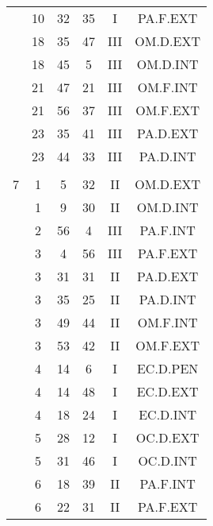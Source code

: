 \documentclass[12pt, a4paper]{article}
\begin{document}
\begin{multicols}{3}
{\begin{tabular}{c c c c c c}
	 	 	 	 & 10 & 32 & 35 & I & PA.F.EXT\\%
	 	 	 	 & 18 & 35 & 47 & III & OM.D.EXT\\%
	 	 	 	 & 18 & 45 & 5 & III & OM.D.INT\\%
	 	 	 	 & 21 & 47 & 21 & III & OM.F.INT\\%
	 	 	 	 & 21 & 56 & 37 & III & OM.F.EXT\\%
	 	 	 	 & 23 & 35 & 41 & III & PA.D.EXT\\%
	 	 	 	 & 23 & 44 & 33 & III & PA.D.INT\\%
	 	 	 	 & & & & & \\%
	 	 	 	7 & 1 & 5 & 32 & II & OM.D.EXT\\%
	 	 	 	 & 1 & 9 & 30 & II & OM.D.INT\\%
	 	 	 	 & 2 & 56 & 4 & III & PA.F.INT\\%
	 	 	 	 & 3 & 4 & 56 & III & PA.F.EXT\\%
	 	 	 	 & 3 & 31 & 31 & II & PA.D.EXT\\%
	 	 	 	 & 3 & 35 & 25 & II & PA.D.INT\\%
	 	 	 	 & 3 & 49 & 44 & II & OM.F.INT\\%
	 	 	 	 & 3 & 53 & 42 & II & OM.F.EXT\\%
	 	 	 	 & 4 & 14 & 6 & I & EC.D.PEN\\%
	 	 	 	 & 4 & 14 & 48 & I & EC.D.EXT\\%
	 	 	 	 & 4 & 18 & 24 & I & EC.D.INT\\%
	 	 	 	 & 5 & 28 & 12 & I & OC.D.EXT\\%
	 	 	 	 & 5 & 31 & 46 & I & OC.D.INT\\%
	 	 	 	 & 6 & 18 & 39 & II & PA.F.INT\\%
	 	 	 	 & 6 & 22 & 31 & II & PA.F.EXT\\%

\end{tabular}}
\end{multicols}
\end{document}
